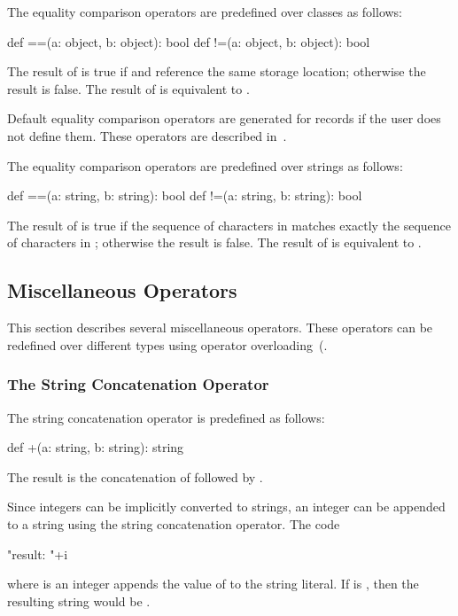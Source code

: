 The equality comparison operators are predefined over classes as
follows:
\begin{chapel}
def ==(a: object, b: object): bool
def !=(a: object, b: object): bool
\end{chapel}
The result of  is true if  and  reference
the same storage location; otherwise the result is false.  The result
of  is equivalent to .

Default equality comparison operators are generated for records if the
user does not define them.  These operators are described
in~.

The equality comparison operators are predefined over strings as
follows:
\begin{chapel}
def ==(a: string, b: string): bool
def !=(a: string, b: string): bool
\end{chapel}
The result of  is true if the sequence of characters
in  matches exactly the sequence of characters in ;
otherwise the result is false.  The result of  is
equivalent to .

\subsection{Miscellaneous Operators}
\label{Miscellaneous_Operators}

This section describes several miscellaneous operators.  These
operators can be redefined over different types using operator
overloading~(.

\subsubsection{The String Concatenation Operator}
\label{The_String_Concatenation_Operator}

The string concatenation operator is predefined as follows:
\begin{chapel}
def +(a: string, b: string): string
\end{chapel}
The result is the concatenation of  followed by .
\begin{example}
Since integers can be implicitly converted to strings, an integer can
be appended to a string using the string concatenation operator.  The
code
\begin{chapel}
"result: "+i
\end{chapel}
where  is an integer appends the value of  to the
string literal.  If  is , then the resulting string
would be .
\end{example}

